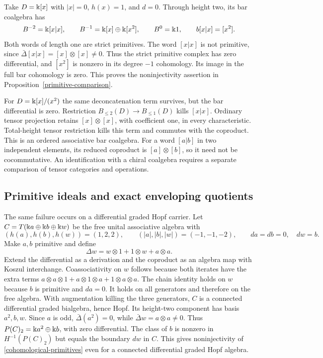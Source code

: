 \begin{example}
\label{bar-primitive-example}
Take $D=\Bbbk[x]$ with $|x|=0$, $h(x)=1$, and $d=0$.
Through height two, its bar coalgebra has
\[
 B^{-2}=\Bbbk[x|x],\qquad
 B^{-1}=\Bbbk[x]\oplus\Bbbk[x^2],\qquad B^0=\Bbbk1,
 \qquad b[x|x]=[x^2].
\]
Both words of length one are strict primitives.
The word $[x|x]$ is not primitive, since
$\bar\Delta[x|x]=[x]\otimes[x]\neq0$.
Thus the strict primitive complex has zero differential, and
$[x^2]$ is nonzero in its degree $-1$ cohomology.
Its image in the full bar cohomology is zero.
This proves the noninjectivity assertion in
Proposition~\ref{primitive-comparison}.

For $D=\Bbbk[x]/(x^2)$ the same deconcatenation term survives, but the
bar differential is zero.  Restriction $B_{\leq2}(D)\to B_{\leq1}(D)$
kills $[x|x]$.  Ordinary tensor projection retains
$[x]\otimes[x]$, with coefficient one, in every characteristic.
Total-height tensor restriction kills this term and commutes with
the coproduct.  This is an ordered associative bar coalgebra.
For a word $[a|b]$ in two independent elements, its reduced coproduct is
$[a]\otimes[b]$, so it need not be cocommutative.
An identification with a chiral coalgebra requires a separate comparison
of tensor categories and operations.
\end{example}

\subsection{Primitive ideals and exact enveloping quotients}

The same failure occurs on a differential graded Hopf carrier.
Let $C=T(\Bbbk a\oplus\Bbbk b\oplus\Bbbk w)$ be the free unital
associative algebra with
\[
 (h(a),h(b),h(w))=(1,2,2),\qquad
 (|a|,|b|,|w|)=(-1,-1,-2),
 \qquad da=db=0,\quad dw=b.
\]
Make $a,b$ primitive and define
\[
 \Delta w=w\otimes1+1\otimes w+a\otimes a.
\]
Extend the differential as a derivation and the coproduct as an algebra
map with Koszul interchange.  Coassociativity on $w$ follows because
both iterates have the extra terms
$a\otimes a\otimes1+a\otimes1\otimes a+1\otimes a\otimes a$.
The chain identity holds on $w$ because $b$ is primitive and $da=0$.
It holds on all generators and therefore on the free algebra.
With augmentation killing the three generators, $C$ is a connected
differential graded bialgebra, hence Hopf.
Its height-two component has basis $a^2,b,w$.
Since $a$ is odd, $\bar\Delta(a^2)=0$, while
$\bar\Delta w=a\otimes a\neq0$.
Thus $P(C)_2=\Bbbk a^2\oplus\Bbbk b$, with zero differential.
The class of $b$ is nonzero in $H^{-1}(P(C)_2)$ but equals the boundary
$dw$ in $C$.  This gives noninjectivity of
\eqref{cohomological-primitives} even for a connected differential
graded Hopf algebra.

